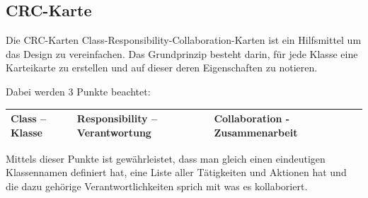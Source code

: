 \documentclass[a4paper,12pt]{article}
\begin{document}
\subsection{CRC-Karte}
Die CRC-Karten Class-Responsibility-Collaboration-Karten ist ein Hilfsmittel um das Design zu vereinfachen. Das Grundprinzip besteht darin, für jede Klasse eine Karteikarte zu erstellen und auf dieser deren Eigenschaften zu notieren. \par Dabei werden 3 Punkte beachtet:
\begin{center}
    \begin{tabular}{|l|l|l|l|}
        \hline
        Class – Klasse & Responsibility – Verantwortung & Collaboration - Zusammenarbeit \\
        \hline
    \end{tabular}
\end{center}
Mittels dieser Punkte ist gewährleistet, dass man gleich einen eindeutigen Klassennamen definiert hat, eine Liste aller Tätigkeiten und Aktionen hat und die dazu gehörige Verantwortlichkeiten sprich mit was es kollaboriert.
\end{document}
